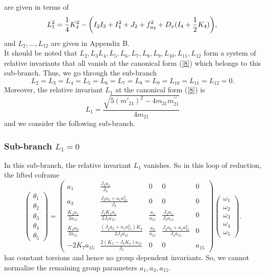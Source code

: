 \documentclass[12pt]{article}
\begin{document}
are given in terms of 
\begin{equation}\label{120}
L_1^2=\frac{1}{4}K_4^2-\bigg(I_2I_3+I_4^2+J_2+f^2_{u_2}+D_x(I_4+\frac{1}{2}K_4)\bigg),\\
\end{equation}
and $L_2,\dots,L_{12}$ are given in Appendix B.\\

It should be noted that $ L_2,L_3L_4, L_5,L_6,L_7, L_8,L_9, L_{10}, L_{11},L_{12}$ form a system of relative invariants that all vanish at the canonical form (\ref{8}) which belongs to this sub-branch. Thus, we go through the sub-branch 
\begin{equation} 
 L_2=L_3= L_4= L_5=L_6=L_7=L_8= L_9= L_{10}= L_{11}=L_{12}=0.
\end{equation}
Moreover, the relative invariant $L_1$ at the canonical form (\ref{8}) is
\begin{equation}
L_1=\frac{\sqrt{5(m'_{21})^2-4m_{21}m^{\prime\prime}_{21}}}{4m_{21}}
\end{equation}
and we consider the following sub-branch.

\subsubsection{Sub-branch $L_1=0$}
In this sub-branch, the relative invariant $L_1$ vanishes. So in this loop of reduction, the lifted coframe
\begin{equation}
\begin{pmatrix}
\theta_1\\
\theta_2\\
\theta_3\\
\theta_4\\
\theta_5
\end{pmatrix}=\begin{pmatrix}
a_1&\frac{J_2a_1}{J_3}&0&0&0\\
a_3&\frac{J_2a_3+a_1a_{15}^2}{J_3}&0&0&0\\
\frac{K_4a_1}{2a_{15}}&\frac{J_2K_4a_1}{2J_3a_{15}}&\frac{a_1}{a_{15}}&\frac{J_2a_1}{J_3a_{15}}&0\\
\frac{K_4a_3}{2a_{15}}&\frac{(J_2a_3+a_1a_{15}^2)K_4}{2J_3a_{15}}&\frac{a_3}{a_{15}}&\frac{J_2a_3+a_1a_{15}^2}{J_3a_{15}}&0\\
-2K_7a_{15}&\frac{2(K_5-J_2K_7)a_{15}}{J_3}&0&0&a_{15}
\end{pmatrix}\begin{pmatrix}
\omega_1\\
\omega_2\\
\omega_3\\
\omega_4\\
\omega_5
\end{pmatrix}.
\end{equation}
has constant torsions and hence no group dependent invariants. So,  we cannot normalize the remaining group parameters $a_1, a_3,a_{15}$. \\
\end{document}
